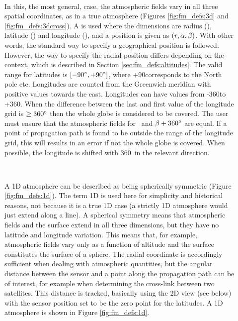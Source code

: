 \begin{description}
  
\item[\,\,\,] In this, the most general, case, the
  atmospheric fields vary in all three spatial coordinates, as in a
  true atmosphere (Figures \ref{fig:fm_defs:3d} and
  \ref{fig:fm_defs:3dcross}). A  is used where the dimensions are radius (\Rds), latitude
  (\Lat) and longitude (\Lon), and a position is given as
  $(r,\alpha,\beta)$. With other words, the standard way to specify a
  geographical position is followed.  However, the way to specify the
  radial position differs depending on the context, which is described
  in Section \ref{sec:fm_defs:altitudes}. The valid range for
  latitudes is $[-90^\circ,+90^\circ]$, where +90\degree corresponds
  to the North pole etc. Longitudes are counted from the Greenwich
  meridian with positive values towards the east. Longitudes can have
  values from -360\degree to +360\degree. When the difference between
  the last and first value of the longitude grid is $\geq 360^\circ$
  then the whole globe is considered to be covered. The user must
  ensure that the atmospheric fields for \Lon\ and $\beta+360^\circ$
  are equal. If a point of propagation path is found to be outside the
  range of the longitude grid, this will results in an error if not
  the whole globe is covered. When possible, the longitude is shifted with
  360\degree\ in the relevant direction.
  
\item[\,\,\,] A 1D atmosphere can be described as being
  spherically symmetric (Figure \ref{fig:fm_defs:1d}). The term 1D is
  used here for simplicity and historical reasons, not because it is a
  true 1D case (a strictly 1D atmosphere would just extend along a
  line). A spherical symmetry means that atmospheric fields and the
  surface extend in all three dimensions, but they have no latitude
  and longitude variation. This means that, for example, atmospheric
  fields vary only as a function of altitude and the surface
  constitutes the surface of a sphere. The radial coordinate is
  accordingly sufficient when dealing with atmospheric quantities, but
  the angular distance between the sensor and a point along the
  propagation path can be of interest, for example when determining
  the cross-link between two satellites. This distance is tracked, 
  basically using the 2D view (see below) with the sensor
  position set to be the zero point for the latitudes. A 1D
  atmosphere is shown in Figure \ref{fig:fm_defs:1d}.
  

\end{description}
